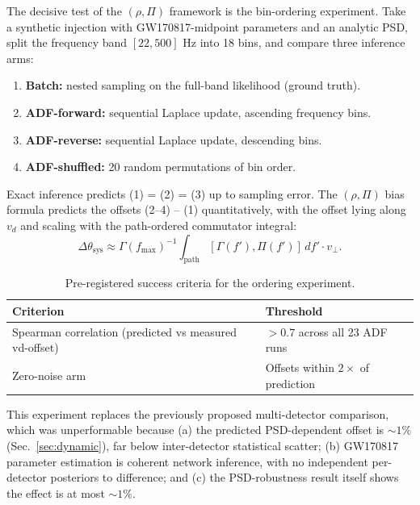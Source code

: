 \documentclass[twocolumn,prd,showpacs,superscriptaddress]{revtex4-2}
\newcommand{\vd}{v_{d}}          %
\begin{document}
The decisive test of the $(\rho, \Pi)$ framework is the bin-ordering experiment. Take a synthetic injection with GW170817-midpoint parameters and an analytic PSD, split the frequency band $[22, 500]$ Hz into 18 bins, and compare three inference arms:

\begin{enumerate}
\item \textbf{Batch:} nested sampling on the full-band likelihood (ground truth).
\item \textbf{ADF-forward:} sequential Laplace update, ascending frequency bins.
\item \textbf{ADF-reverse:} sequential Laplace update, descending bins.
\item \textbf{ADF-shuffled:} 20 random permutations of bin order.
\end{enumerate}

Exact inference predicts (1) = (2) = (3) up to sampling error. The $(\rho, \Pi)$ bias formula predicts the offsets (2--4) -- (1) quantitatively, with the offset lying along $\vd$ and scaling with the path-ordered commutator integral:
\begin{equation}
\Delta\theta_{\text{sys}} \approx \Gamma(f_{\max})^{-1} \int_{\text{path}} [\Gamma(f'), \Pi(f')]\,df' \cdot v_\perp .
\label{eq:sys_offset}
\end{equation}

\begin{table}[tp]
\centering
\renewcommand{\arraystretch}{1.2}
\caption{Pre-registered success criteria for the ordering experiment.}
\label{tab:ordering}
\begin{tabularx}{\textwidth}{@{}l X@{}}
\toprule
Criterion & Threshold \\
\midrule
Spearman correlation (predicted vs measured vd-offset) & $>0.7$ across all 23 ADF runs \\
Zero-noise arm & Offsets within $2\times$ of prediction \\
\bottomrule
\end{tabularx}
\end{table}

This experiment replaces the previously proposed multi-detector comparison, which was unperformable because (a) the predicted PSD-dependent offset is $\sim1\%$ (Sec.~\ref{sec:dynamic}), far below inter-detector statistical scatter; (b) GW170817 parameter estimation is coherent network inference, with no independent per-detector posteriors to difference; and (c) the PSD-robustness result itself shows the effect is at most $\sim1\%$.
\end{document}

